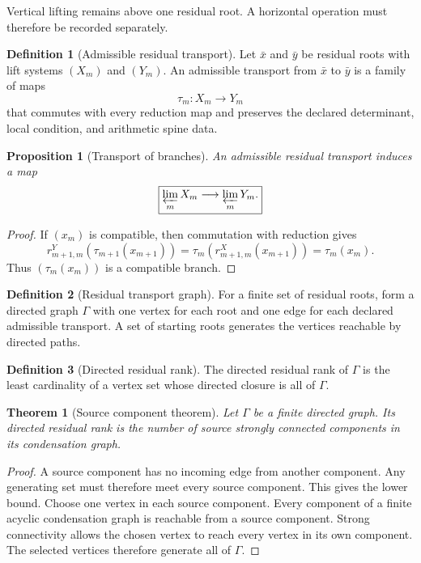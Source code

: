 \documentclass{aomart}
\newtheorem{theorem}{Theorem}[section]
\newtheorem{proposition}[proposition]{Proposition}
\theoremstyle{definition}
\newtheorem{definition}[definition]{Definition}
\theoremstyle{remark}
\begin{document}
Vertical lifting remains above one residual root. A horizontal operation must therefore be recorded separately.

\begin{definition}[Admissible residual transport]\label{def:residual_transport}
Let \(\bar x\) and \(\bar y\) be residual roots with lift systems \((X_m)\) and \((Y_m)\). An admissible transport from \(\bar x\) to \(\bar y\) is a family of maps
\[
\tau_m:X_m\longrightarrow Y_m
\]
that commutes with every reduction map and preserves the declared determinant, local condition, and arithmetic spine data.
\end{definition}

\begin{proposition}[Transport of branches]\label{prop:transport_branches}
An admissible residual transport induces a map
\[
\boxed{
\varprojlim_mX_m
\longrightarrow
\varprojlim_mY_m.
}
\]
\end{proposition}

\begin{proof}
If \((x_m)\) is compatible, then commutation with reduction gives
\[
r^Y_{m+1,m}(\tau_{m+1}(x_{m+1}))
=
\tau_m(r^X_{m+1,m}(x_{m+1}))
=
\tau_m(x_m).
\]
Thus \((\tau_m(x_m))\) is a compatible branch.
\end{proof}

\begin{definition}[Residual transport graph]\label{def:transport_graph}
For a finite set of residual roots, form a directed graph \(\Gamma\) with one vertex for each root and one edge for each declared admissible transport. A set of starting roots generates the vertices reachable by directed paths.
\end{definition}

\begin{definition}[Directed residual rank]\label{def:directed_rank}
The directed residual rank of \(\Gamma\) is the least cardinality of a vertex set whose directed closure is all of \(\Gamma\).
\end{definition}

\begin{theorem}[Source component theorem]\label{thm:source_scc}
Let \(\Gamma\) be a finite directed graph. Its directed residual rank is the number of source strongly connected components in its condensation graph.
\end{theorem}

\begin{proof}
A source component has no incoming edge from another component. Any generating set must therefore meet every source component. This gives the lower bound. Choose one vertex in each source component. Every component of a finite acyclic condensation graph is reachable from a source component. Strong connectivity allows the chosen vertex to reach every vertex in its own component. The selected vertices therefore generate all of \(\Gamma\).
\end{proof}
\end{document}
